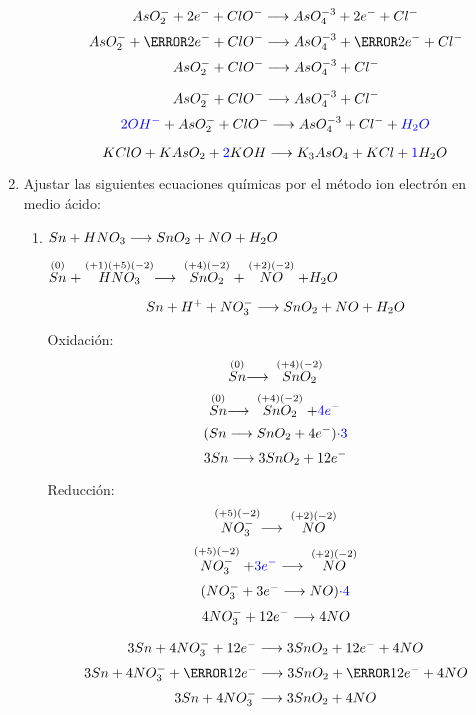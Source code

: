\documentclass[../Práctica.root.tex]{subfiles}
\begin{document}
\begin{enumerate}
\begin{enumerate}
                    \[ AsO_2^- + 2e^- + ClO^- \longrightarrow{} AsO_4^{-3} + 2e^- + Cl^- \]
                    \[ AsO_2^- + \cancel{2e^-} + ClO^- \lra AsO_4^{-3} + \cancel{2e^-} + Cl^- \]
                    \[ AsO_2^- + ClO^- \longrightarrow{} AsO_4^{-3} + Cl^- \]

                    \[ AsO_2^- + ClO^- \longrightarrow{} AsO_4^{-3} + Cl^- \]
                    \[ \textcolor{blue}{2OH^-} + AsO_2^- + ClO^- \longrightarrow{} AsO_4^{-3} + Cl^- + \textcolor{blue}{H_2O} \]

                    \[ KClO + KAsO_2 + \textcolor{blue}{2} KOH \longrightarrow{} K_3AsO_4 + KCl + \textcolor{blue}{1} H_2O \]
          \end{enumerate}

    \item Ajustar las siguientes ecuaciones químicas por el método ion electrón en medio ácido:
          \begin{enumerate}
              \item $Sn + HNO_3 \longrightarrow{} SnO_2 + NO + H_2O$

                    $\stackrel{(0)}{Sn} + \stackrel{(+1)(+5)(-2)}{HNO_3} \longrightarrow{} \stackrel{(+4)(-2)}{SnO_2} + \stackrel{(+2)(-2)}{NO} + H_2O$

                    \[ Sn + H^+ + NO_3^- \longrightarrow{} SnO_2 + NO + H_2O \]

                    \begin{multicols}{2}
                        Oxidación:
                        \[ \stackrel{(0)}{Sn} \longrightarrow{} \stackrel{(+4)(-2)}{SnO_2} \]
                        \[ \stackrel{(0)}{Sn} \longrightarrow{} \stackrel{(+4)(-2)}{SnO_2} + \textcolor{blue}{4 e^-} \]
                        \[ (Sn \longrightarrow{} SnO_2 + 4 e^-)\textcolor{blue}{\cdot 3} \]
                        \[ 3 Sn \longrightarrow{} 3 SnO_2 + 12 e^- \]

                        \columnbreak

                        Reducción:
                        \[ \stackrel{(+5)(-2)}{NO_3^-} \longrightarrow{} \stackrel{(+2)(-2)}{NO} \]
                        \[ \stackrel{(+5)(-2)}{NO_3^-} + \textcolor{blue}{3e^-} \longrightarrow{} \stackrel{(+2)(-2)}{NO} \]
                        \[ (NO_3^- + 3e^- \longrightarrow{} NO)\textcolor{blue}{\cdot 4} \]
                        \[ 4 NO_3^- + 12 e^- \longrightarrow{} 4 NO \]
                    \end{multicols}

                    \[ 3 Sn + 4 NO_3^- + 12 e^- \longrightarrow{} 3 SnO_2 + 12 e^- + 4 NO \]
                    \[ 3 Sn + 4 NO_3^- + \cancel{12 e^-} \lra 3 SnO_2 + \cancel{12 e^-} + 4 NO \]
                    \[ 3 Sn + 4 NO_3^- \longrightarrow{} 3 SnO_2 + 4 NO \]


\end{enumerate}
\end{enumerate}
\end{document}
